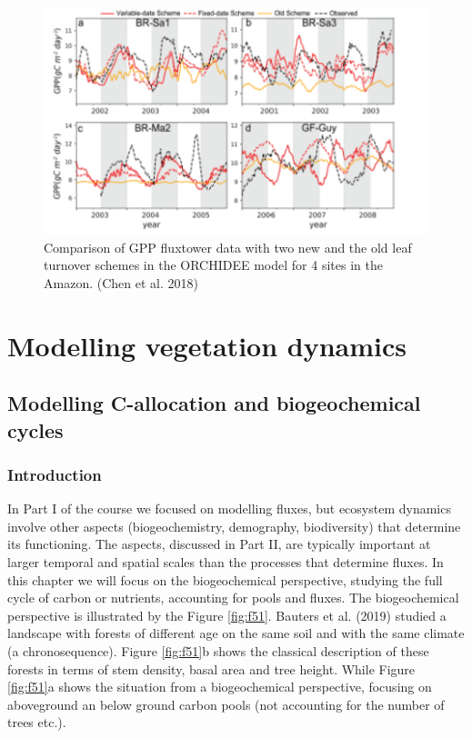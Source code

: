 \documentclass[12pt,oneside]{book}
\begin{document}
\begin{figure}

{\centering \includegraphics[width=0.8\linewidth]{figures/chap4/f413_chen3} 

}

\caption{Comparison of GPP fluxtower data with two new and the old leaf turnover schemes in the ORCHIDEE model for 4 sites in the Amazon. (Chen et al. 2018)}\label{fig:f413}
\end{figure}

\part{Modelling vegetation
dynamics}\label{part-modelling-vegetation-dynamics}

\chapter{Modelling C-allocation and biogeochemical
cycles}\label{modelling-c-allocation-and-biogeochemical-cycles}


\section{Introduction}\label{introduction-1}

In Part I of the course we focused on modelling fluxes, but ecosystem
dynamics involve other aspects (biogeochemistry, demography,
biodiversity) that determine its functioning. The aspects, discussed in
Part II, are typically important at larger temporal and spatial scales
than the processes that determine fluxes. In this chapter we will focus
on the biogeochemical perspective, studying the full cycle of carbon or
nutrients, accounting for pools and fluxes. The biogeochemical
perspective is illustrated by the Figure \ref{fig:f51}. Bauters et al.
(2019) studied a landscape with forests of different age on the same
soil and with the same climate (a chronosequence). Figure \ref{fig:f51}b
shows the classical description of these forests in terms of stem
density, basal area and tree height. While Figure \ref{fig:f51}a shows
the situation from a biogeochemical perspective, focusing on aboveground
an below ground carbon pools (not accounting for the number of trees
etc.).
\end{document}
